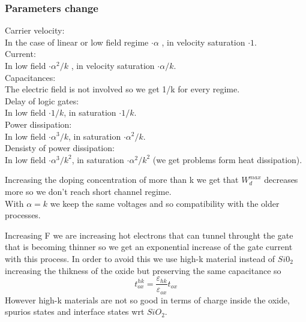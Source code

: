 \subsubsection{Parameters change}
\tab Carrier velocity:\\
In the case of linear or low field regime $\cdot \alpha$ , in velocity saturation $\cdot 1$.\\
\tab Current:\\
In low field $\cdot \alpha^2/k$ , in velocity saturation $\cdot \alpha/k$.\\
\tab Capacitances:\\
The electric field is not involved so we get 1/k for every regime.\\
\tab Delay of logic gates:\\
In low field $\cdot 1/k$, in saturation $\cdot 1/k$.\\
\tab Power dissipation:\\
In low field $\cdot \alpha^3/k$, in saturation $\cdot \alpha^2/k$.\\
\tab Densisty of power dissipation:\\
In low field $\cdot \alpha^3/k^2$, in saturation $\cdot \alpha^2/k^2$ (we get problems form heat dissipation).\\

\vspace{5mm}

Increasing the doping concentration of more than k we get that $W_d^{max}$ decreases more so we don't reach short channel regime.\\
With $\alpha=k$ we keep the same voltages and so compatibility with the older processes.\\

\vspace{5mm}

Increasing F we are increasing hot electrons that can tunnel throught the gate that is becoming thinner so we get an exponential increase of the gate current with this process. In order to avoid this we use high-k material instead of $Si0_2$ increasing the thikness of the oxide but preserving the same capacitance so 
\begin{equation}
t_{ox}^{hk}=\frac{\varepsilon_{hk}}{\varepsilon_{ox}}t_{ox}
\end{equation}
However high-k materials are not so good in terms of charge inside the oxide, spurios states and interface states wrt $SiO_2$.\\ 

